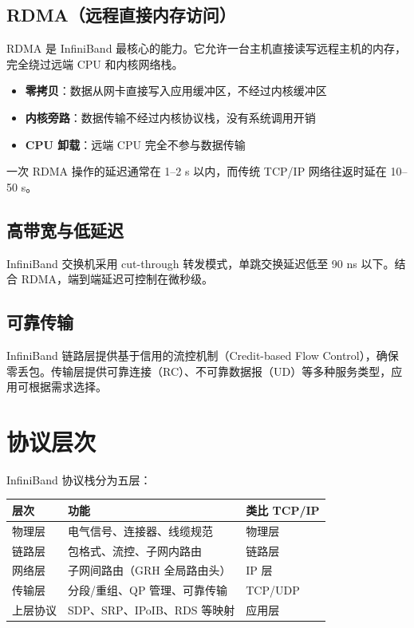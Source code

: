 \subsection{RDMA（远程直接内存访问）}

RDMA 是 InfiniBand 最核心的能力。它允许一台主机直接读写远程主机的内存，完全绕过远端 CPU 和内核网络栈。

\begin{itemize}
  \item \textbf{零拷贝}：数据从网卡直接写入应用缓冲区，不经过内核缓冲区
  \item \textbf{内核旁路}：数据传输不经过内核协议栈，没有系统调用开销
  \item \textbf{CPU 卸载}：远端 CPU 完全不参与数据传输
\end{itemize}

一次 RDMA 操作的延迟通常在 1--2 \textmu{}s 以内，而传统 TCP/IP 网络往返时延在 10--50 \textmu{}s。

\subsection{高带宽与低延迟}

InfiniBand 交换机采用 cut-through 转发模式，单跳交换延迟低至 90 ns 以下。结合 RDMA，端到端延迟可控制在微秒级。

\subsection{可靠传输}

InfiniBand 链路层提供基于信用的流控机制（Credit-based Flow Control），确保零丢包。传输层提供可靠连接（RC）、不可靠数据报（UD）等多种服务类型，应用可根据需求选择。

\section{协议层次}

InfiniBand 协议栈分为五层：

\begin{longtable}{lll}
\toprule
\textbf{层次} & \textbf{功能} & \textbf{类比 TCP/IP} \\
\midrule
\endhead
\bottomrule
\endfoot
物理层   & 电气信号、连接器、线缆规范        & 物理层 \\
链路层   & 包格式、流控、子网内路由           & 链路层 \\
网络层   & 子网间路由（GRH 全局路由头）       & IP 层 \\
传输层   & 分段/重组、QP 管理、可靠传输       & TCP/UDP \\
上层协议 & SDP、SRP、IPoIB、RDS 等映射       & 应用层 \\
\end{longtable}

